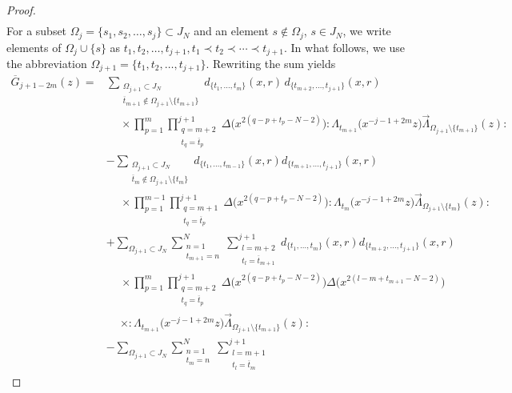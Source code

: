 \documentclass[10pt,a4paper]{amsart}
\numberwithin{equation}{section}
\begin{document}
\begin{proof}
\begin{align*}
\end{align*}
For a subset $\Omega_j=\{s_1, s_2, \dots, s_j\}\subset J_N$ and an element $s \notin \Omega_j$,
$s \in J_N$, we write elements of $\Omega_j \cup \{s\}$ as
$t_1, t_2, \dots, t_{j+1}, t_1 \prec t_2 \prec \cdots \prec t_{j+1}$.
In what follows, we use the abbreviation
$\Omega_{j+1}=\{t_1, t_2, \dots, t_{j+1}\}$.
Rewriting the sum yields
\begin{align*}
\overline{G}_{j+1-2m}(z)={}&
\sum\limits_{\substack{{\Omega}_{j+1} \subset J_N
\\ \overline{t}_{m+1} \notin {\Omega}_{j+1}
\setminus \{t_{m+1}\}}}
d_{\{t_1, \dots, t_m\}}(x,r)\,
d_{\{t_{m+2}, \dots, t_{j+1}\}}(x,r)
\\ \qquad
&\phantom{-}\times \prod_{p=1}^m\prod\limits_{\substack{q=m+2 \\t_q=\overline{t}_p}}^{j+1}
\Delta\big(x^{2(q-p+t_p-N-2)}\big){:}\Lambda_{t_{m+1}}\big(x^{-j-1+2m}z\big)
\overrightarrow{\Lambda}_{{\Omega}_{j+1}
\setminus \{t_{m+1}\}}(z){:}
\\
&-\sum\limits_{\substack{\Omega_{j+1}\subset J_N
\\ \overline{t}_m \notin \Omega_{j+1} \setminus \{t_m\}}}
d_{\{t_1,\dots, t_{m-1}\}}(x,r) d_{\{t_{m+1}, \dots, t_{j+1}\}}(x,r)
\\
&\phantom{-}\times \prod_{p=1}^{m-1}\prod\limits_{\substack{q=m+1\\t_q=\overline{t}_p}}^{j+1}
\Delta\big(x^{2(q-p+t_p-N-2)}\big){:}\Lambda_{t_{m}}\big(x^{-j-1+2m}z\big)
\overrightarrow{\Lambda}_{\Omega_{j+1}\setminus \{t_{m}\}}(z){:}
\\
&+\sum_{\Omega_{j+1} \subset J_N}
\sum\limits_{\substack{n=1\\ t_{m+1}=n}}^N
\sum\limits_{\substack{l=m+2\\ t_l=\overline{t}_{m+1}}}^{j+1}
d_{\{t_1,\dots, t_m\}}(x,r) d_{\{t_{m+2}, \dots, t_{j+1}\}}(x,r)
\\
&\phantom{-}\times \prod_{p=1}^m\prod\limits_{\substack{q=m+2\\t_q=\overline{t}_p}}^{j+1}
\Delta\big(x^{2(q-p+t_p-N-2)}\big)\Delta\big(x^{2(l-m+t_{m+1}-N-2)}\big)
\\
&\phantom{-}\times {:}\Lambda_{t_{m+1}}\big(x^{-j-1+2m}z\big)
\overrightarrow{\Lambda}_{\Omega_{j+1}\setminus \{t_{m+1}\}}(z){:}
\\
&-\sum_{\Omega_{j+1}\subset J_N}
\sum\limits_{\substack{n=1\\t_m=n}}^N
\sum\limits_{\substack{l=m+1\\t_l=\overline{t}_m}}^{j+1}

\end{align*}
\end{proof}
\end{document}
